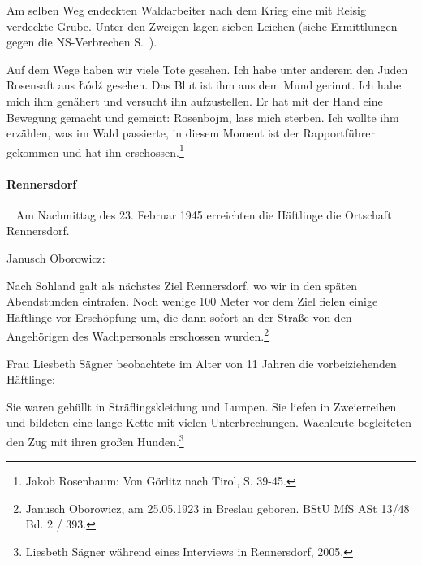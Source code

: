 Am selben Weg endeckten Waldarbeiter nach dem Krieg eine mit Reisig verdeckte Grube. Unter den Zweigen lagen sieben Leichen (siehe Ermittlungen gegen die NS-Verbrechen S.~\pageref{buschschenke}).

\begin{leftbar}   
Auf dem Wege haben wir viele Tote gesehen. Ich habe unter anderem den Juden Rosensaft aus \L \'od\'z gesehen. Das Blut ist ihm aus dem Mund gerinnt. Ich habe mich ihm genähert und versucht ihn aufzustellen. Er hat mit der Hand eine Bewegung gemacht und gemeint: Rosenbojm, lass mich sterben. Ich wollte ihm erzählen, was im Wald passierte, in diesem Moment ist der Rapportführer gekommen und hat ihn erschossen.\footnote{Jakob Rosenbaum: Von Görlitz nach Tirol, S. 39-45.}
\end{leftbar}

\paragraph{Rennersdorf}
~\newline
Am Nachmittag des 23. Februar 1945 erreichten die Häftlinge die Ortschaft Rennersdorf. 

Janusch Oborowicz:
\begin{leftbar}   
Nach Sohland galt als nächstes Ziel Rennersdorf, wo wir in den späten Abendstunden eintrafen. Noch wenige 100 Meter vor dem Ziel fielen einige Häftlinge vor Erschöpfung um, die dann sofort an der Straße von den Angehörigen des Wachpersonals erschossen wurden.\footnote{Janusch Oborowicz, am 25.05.1923 in Breslau geboren. BStU MfS ASt 13/48 Bd. 2 / 393.}
\end{leftbar}

Frau Liesbeth Sägner beobachtete im Alter von 11 Jahren die vorbeiziehenden Häftlinge:
\begin{leftbar}   
Sie waren gehüllt in Sträflingskleidung und Lumpen. Sie liefen in Zweierreihen und bildeten eine lange Kette mit vielen Unterbrechungen. Wachleute begleiteten den Zug mit ihren großen Hunden.\footnote{Liesbeth Sägner während eines Interviews in Rennersdorf, 2005.}
\end{leftbar}

